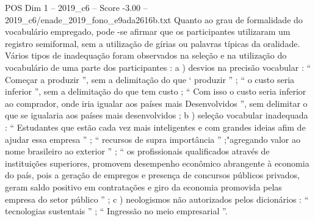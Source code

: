 \begin{textsample}{POS Dim 1 – 2019\_c6 – Score -3.00 – 2019\_c6/enade\_2019\_fono\_e9ada2616b.txt}
Quanto ao grau de formalidade do vocabulário empregado, pode -se afirmar que os participantes utilizaram um registro semiformal, sem a utilização de gírias ou palavras típicas da oralidade.
Vários tipos de inadequação foram observados na seleção e na utilização do vocabulário de uma parte dos participantes : a ) desvios na precisão vocabular : “ Começar a produzir ”, sem a delimitação do que ‘ produzir ” ; “ o custo seria inferior ”, sem a delimitação do que tem custo ; “ Com isso o custo seria inferior ao comprador, onde iria igualar aos países mais Desenvolvidos ”, sem delimitar o que se igualaria aos países mais desenvolvidos ; b ) seleção vocabular inadequada : “ Estudantes que estão cada vez mais inteligentes e com grandes ideias afim de ajudar essa empresa ” ; “ recursos de supra importância ” ;"agregando valor ao nome brasileiro ao exterior ” ; “ os profissionais qualificados através de instituições superiores, promovem desempenho econômico abrangente à economia do país, pois a geração de empregos e presença de concursos públicos privados, geram saldo positivo em contratações e giro da economia promovida pelas empresa do setor público ” ; c ) neologismos não autorizados pelos dicionários : “ tecnologias sustentais ” ; “ Ingressão no meio empresarial ”.

\end{textsample}
